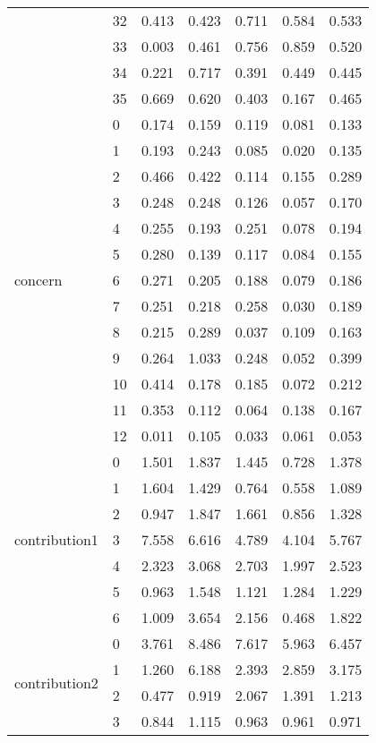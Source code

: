 \begin{table}
\begin{tabular}{llrrrrr}
 & 32 & 0.413 & 0.423 & 0.711 & 0.584 & 0.533 \\
 & 33 & 0.003 & 0.461 & 0.756 & 0.859 & 0.520 \\
 & 34 & 0.221 & 0.717 & 0.391 & 0.449 & 0.445 \\
 & 35 & 0.669 & 0.620 & 0.403 & 0.167 & 0.465 \\
\cline{1-7}
\multirow[t]{13}{*}{concern} & 0 & 0.174 & 0.159 & 0.119 & 0.081 & 0.133 \\
 & 1 & 0.193 & 0.243 & 0.085 & 0.020 & 0.135 \\
 & 2 & 0.466 & 0.422 & 0.114 & 0.155 & 0.289 \\
 & 3 & 0.248 & 0.248 & 0.126 & 0.057 & 0.170 \\
 & 4 & 0.255 & 0.193 & 0.251 & 0.078 & 0.194 \\
 & 5 & 0.280 & 0.139 & 0.117 & 0.084 & 0.155 \\
 & 6 & 0.271 & 0.205 & 0.188 & 0.079 & 0.186 \\
 & 7 & 0.251 & 0.218 & 0.258 & 0.030 & 0.189 \\
 & 8 & 0.215 & 0.289 & 0.037 & 0.109 & 0.163 \\
 & 9 & 0.264 & 1.033 & 0.248 & 0.052 & 0.399 \\
 & 10 & 0.414 & 0.178 & 0.185 & 0.072 & 0.212 \\
 & 11 & 0.353 & 0.112 & 0.064 & 0.138 & 0.167 \\
 & 12 & 0.011 & 0.105 & 0.033 & 0.061 & 0.053 \\
\cline{1-7}
\multirow[t]{7}{*}{contribution1} & 0 & 1.501 & 1.837 & 1.445 & 0.728 & 1.378 \\
 & 1 & 1.604 & 1.429 & 0.764 & 0.558 & 1.089 \\
 & 2 & 0.947 & 1.847 & 1.661 & 0.856 & 1.328 \\
 & 3 & 7.558 & 6.616 & 4.789 & 4.104 & 5.767 \\
 & 4 & 2.323 & 3.068 & 2.703 & 1.997 & 2.523 \\
 & 5 & 0.963 & 1.548 & 1.121 & 1.284 & 1.229 \\
 & 6 & 1.009 & 3.654 & 2.156 & 0.468 & 1.822 \\
\cline{1-7}
\multirow[t]{8}{*}{contribution2} & 0 & 3.761 & 8.486 & 7.617 & 5.963 & 6.457 \\
 & 1 & 1.260 & 6.188 & 2.393 & 2.859 & 3.175 \\
 & 2 & 0.477 & 0.919 & 2.067 & 1.391 & 1.213 \\
 & 3 & 0.844 & 1.115 & 0.963 & 0.961 & 0.971 \\

\end{tabular}
\end{table}
